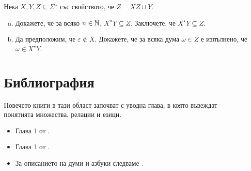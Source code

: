 \begin{problem}
  Нека $X, Y, Z \subseteq \Sigma^\star$ със свойството, че $Z = XZ \cup Y$.
  \begin{enumerate}[a)]
  \item 
    Докажете, че за всяко $n \in \mathbb{N}$, $X^nY \subseteq Z$.
    Заключете, че $X^\star Y \subseteq Z$.
  \item
    Да предположим, че $\varepsilon \not\in X$.
    Докажете, че за всяка дума $\omega \in Z$ е изпълнено, че $\omega \in X^\star Y$.
  \end{enumerate}
\end{problem}

\section*{Библиография}

Повечето книги в тази област започват с уводна глава, в която въвеждат понятията множества, релации и езици.
\begin{itemize}
\item 
  Глава 1 от \cite{rosen}.
\item
  Глава 1 от \cite{papadimitriou}.
\item
  За описанието на думи и азбуки следваме \cite[Глава 2]{kozen}.
\end{itemize}

